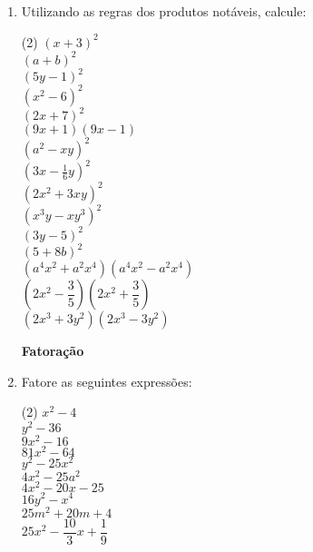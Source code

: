 	\begin{enumerate}
		\item Utilizando as regras dos produtos notáveis, calcule:\\
		\begin{tasks}(2)
			\task $( x + 3 )^2 $ \\[-0.25cm]
			\task $( a + b )^2 $ \\[-0.25cm]
			\task $( 5y - 1 )^2 $ \\[-0.25cm]
			\task $( x^2 - 6 )^2 $ \\[-0.25cm]
			\task $( 2x + 7 )^2 $ \\[-0.25cm]
			\task $( 9x + 1 )(9x - 1) $ \\[-0.25cm]
			\task $( a^2 -xy )^2 $ \\[-0.25cm]
			\task $( 3x - \frac{1}{6}y )^2 $ \\[-0.25cm]
			\task $( 2x^2 + 3xy )^2 $ \\[-0.25cm]
			\task $ (x^3y - xy^3)^2 $ \\[-0.25cm]
			\task $ (3y - 5)^2 $ \\[-0.25cm]
			\task $ (5 + 8b)^2 $ \\[-0.25cm]
			\task $ (a^4x^2 + a^2x^4) (a^4x^2 - a^2x^4)$ \\[-0.25cm]
			\task $\left( 2x^2 - \dfrac{3}{5} \right) \left( 2x^2 + \dfrac{3}{5} \right) $ \\[-0.25cm]
			\task $( 2x^3 + 3y^2 ) ( 2x^3 - 3y^2 )$
		\end{tasks}
	
	\hspace{-1.2cm} \textbf{Fatoração}
	
	\item Fatore as seguintes expressões:
	
	\begin{tasks}(2)
		\task $x^2 - 4$ \\[-0.25cm]
		\task $y^2 - 36$ \\[-0.25cm]
		\task $9x^2 - 16$ \\[-0.25cm]
		\task $81x^2 - 64$ \\[-0.25cm]
		\task $y^2 - 25x^2$ \\[-0.25cm]
		\task $4x^2 - 25a^2$ \\[-0.25cm]
		\task $4x^2 - 20x - 25$ \\[-0.25cm]
		\task $16y^2 - x^4$ \\[-0.25cm]
		\task $25m^2 + 20m + 4$ \\[-0.25cm]
		\task $25x^2 - \dfrac{10}{3}x + \dfrac{1}{9}$
	\end{tasks}
	

\end{enumerate}
